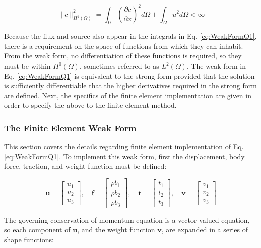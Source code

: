 \documentclass[10pt]{article}
\begin{document}
\begin{equation}
\|c\|^2_{{H}^1(\Omega)}=\int_{\Omega}\left(\frac{\partial c}{\partial x}\right)^2d\Omega+\int_{\Omega}u^2d\Omega<\infty
\end{equation}

Because the flux and source also appear in the integrals in Eq. \eqref{eq:WeakFormQ1}, there is a requirement on the space of functions from which they can inhabit. From the weak form, no differentiation of these functions is required, so they must be within \(H^0(\Omega)\), sometimes referred to as \(L^2(\Omega)\). The weak form in Eq. \eqref{eq:WeakFormQ1} is equivalent to the strong form provided that the solution is sufficiently differentiable that the higher derivatives required in the strong form are defined. Next, the specifics of the finite element implementation are given in order to specify the above to the finite element method.

\subsubsection{The Finite Element Weak Form}

This section covers the details regarding finite element implementation of Eq. \eqref{eq:WeakFormQ1}. To implement this weak form, first the displacement, body force, traction, and weight function must be defined:

\begin{equation}
\textbf{u}=\begin{bmatrix}u_1\\u_2\\u_3\end{bmatrix},\quad\textbf{f}=\begin{bmatrix}\rho b_1\\\rho b_2\\\rho b_3\end{bmatrix},\quad\textbf{t}=\begin{bmatrix}t_1\\t_2\\t_3\end{bmatrix},\quad\textbf{v}=\begin{bmatrix}v_1\\v_2\\v_3\end{bmatrix}
\end{equation}

The governing conservation of momentum equation is a vector-valued equation, so each component of \(\textbf{u}\), and the weight function \(\textbf{v}\), are expanded in a series of shape functions:
\end{document}
